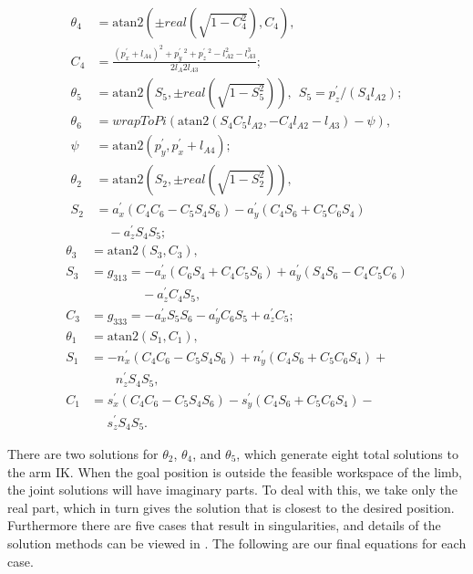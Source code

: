 \documentclass[letterpaper, 10 pt, conference]{IEEEtran}
\providecommand{\atan}{\mathrm{atan2}} %
\begin{document}
\begin{align}
  \theta_4 &= \atan(\pm real(\sqrt{1-C_4^2}), C_4), \nonumber \\
  C_4 &= \frac{(p_x^\prime + l_{A4})^2 + p_y^\prime\,^2 + p_z^\prime\,^2 - l_{A2}^2 - l_{A3}^3}{2l_{A}2l_{A3}}; \nonumber \\
  \theta_5 &= \atan(S_5, \pm real(\sqrt{1-S_5^2})),~~S_5 = p_z^\prime/(S_4l_{A2}); \nonumber \\
  \theta_6 &= wrapToPi(\atan(S_4C_5l_{A2}, -C_4l_{A2} - l_{A3}) - \psi), \nonumber \\
  \psi &= \atan (p_y^\prime, p_x^\prime + l_{A4}); \nonumber \\
  \theta_2 &= \atan(S_2, \pm real(\sqrt{1-S_2^2})), \nonumber \\
  S_2 &= a_x^\prime(C_4C_6 - C_5S_4S_6) - a_y^\prime(C_4S_6 + C_5C_6S_4) \nonumber \\
  &\quad - a_z^\prime S_4S_5; \nonumber
\end{align}
\begin{align}
  \theta_3 &= \atan(S_3, C_3), \nonumber \\
  S_3 &= g_{313} = - a_x^\prime(C_6S_4 + C_4C_5S_6) + a_y^\prime(S_4S_6 - C_4C_5C_6) \nonumber \\
  &\quad\quad\quad\quad - a_z^\prime C_4S_5, \nonumber \\
  C_3 &= g_{333} = - a_x^\prime S_5S_6 - a_y^\prime C_6S_5 + a_z^\prime C_5; \nonumber \\
  \theta_1 &= \atan(S_1, C_1), \nonumber \\
  S_1 &= -n_x^\prime(C_4C_6 - C_5S_4S_6) + n_y^\prime(C_4S_6 + C_5C_6S_4) + \nonumber \\
  &\:\:\:\:\:\:\:\:\: n_z^\prime S_4S_5, \nonumber \\
  C_1 &= s_x^\prime(C_4C_6 - C_5S_4S_6) - s_y^\prime(C_4S_6 + C_5C_6S_4) - \nonumber \\
  &\:\:\:\:\:\: s_z^\prime S_4S_5. \nonumber
\end{align}

There are two solutions for $\theta_2$, $\theta_4$, and $\theta_5$, which generate eight total solutions to the arm IK. When the goal position is outside the feasible workspace of the limb, the joint solutions will have imaginary parts. To deal with this, we take only the real part, which in turn gives the solution that is closest to the desired position. Furthermore there are five cases that result in singularities, and details of the solution methods can be viewed in \cite{Ali:2010wm}. The following are our final equations for each case.
\end{document}
